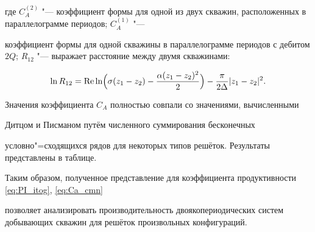 где $C_A^{(2)}$ "--- коэффициент формы для одной из двух скважин, расположенных в параллелограмме периодов; $C_A^{(1)}$ "---

коэффициент формы для одной скважины в параллелограмме периодов с дебитом $2Q$; $R_{12}$ "--- выражает расстояние между двумя скважинами:

\begin{equation}

\ln R_{12}={\rm Re} \ln \Bigl(\sigma (z_1 - z_2) - \frac{\alpha(z_1 - z_2)^2}{2}\Bigr)-\frac{\pi}{2\Delta}|z_1-z_2|^2.

\end{equation}



Значения коэффициента $C_A$ полностью совпали со значениями, вычисленными

Дитцом и  Писманом \cite{roters:bib:Peaceman} путём численного суммирования бесконечных

условно"=сходящихся рядов для некоторых типов решёток. Результаты представлены в таблице.







Таким образом, полученное представление для коэффициента продуктивности \eqref{eq:PI_itog}, \eqref{eq:Ca_cmn}

позволяет анализировать производительность двоякопериодических систем добывающих скважин для решёток произвольных конфигураций.







